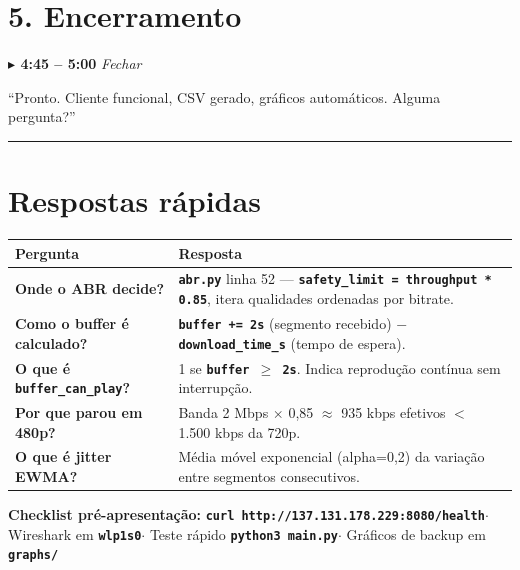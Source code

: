 \documentclass[12pt,a4paper]{article}
\newcommand{\cmd}[1]{\texttt{\textbf{#1}}}
\newcommand{\tempo}[2]{%
  \vspace{5pt}
  \begin{tcolorbox}[base,colback=ctempo!8,colframe=ctempo,boxrule=1pt,
    left=6pt,right=6pt,top=2pt,bottom=2pt]
  \textcolor{ctempo}{\textbf{$\blacktriangleright$ #1}}%
  \hfill\textcolor{ctempo}{\small\textit{#2}}
  \end{tcolorbox}\vspace{3pt}}
\begin{document}
\section{5. Encerramento}

\tempo{4:45 – 5:00}{Fechar}

\begin{falabox}
``Pronto. Cliente funcional, CSV gerado, gráficos automáticos. Alguma pergunta?''
\end{falabox}

\vspace{6pt}
\noindent\rule{\textwidth}{0.8pt}

\section*{Respostas rápidas}

\begin{tcolorbox}[colback=cinzabg,colframe=gray!50,boxrule=0.8pt,arc=3pt,
  left=8pt,right=8pt,top=5pt,bottom=5pt]
\begin{tabularx}{\textwidth}{>{\bfseries}p{4.5cm}X}
\toprule
Pergunta & Resposta \\
\midrule
Onde o ABR decide? &
  \cmd{abr.py} linha 52 — \cmd{safety\_limit = throughput * 0.85}, itera qualidades ordenadas por bitrate. \\
\addlinespace
Como o buffer é calculado? &
  \cmd{buffer += 2s} (segmento recebido) $-$ \cmd{download\_time\_s} (tempo de espera). \\
\addlinespace
O que é \cmd{buffer\_can\_play}? &
  1 se \cmd{buffer $\geq$ 2s}. Indica reprodução contínua sem interrupção. \\
\addlinespace
Por que parou em 480p? &
  Banda 2 Mbps $\times$ 0,85 $\approx$ 935 kbps efetivos $<$ 1.500 kbps da 720p. \\
\addlinespace
O que é jitter EWMA? &
  Média móvel exponencial (alpha=0,2) da variação entre segmentos consecutivos. \\
\bottomrule
\end{tabularx}
\end{tcolorbox}

\vspace{4pt}
\begin{tcolorbox}[colback=bgatencao,colframe=catencao,boxrule=0.8pt,arc=3pt,
  left=8pt,right=8pt,top=4pt,bottom=4pt]
\small
\textbf{Checklist pré-apresentação:}\quad
\cmd{curl http://137.131.178.229:8080/health}\quad$\cdot$\quad
Wireshark em \cmd{wlp1s0}\quad$\cdot$\quad
Teste rápido \cmd{python3 main.py}\quad$\cdot$\quad
Gráficos de backup em \cmd{graphs/}
\end{tcolorbox}
\end{document}
